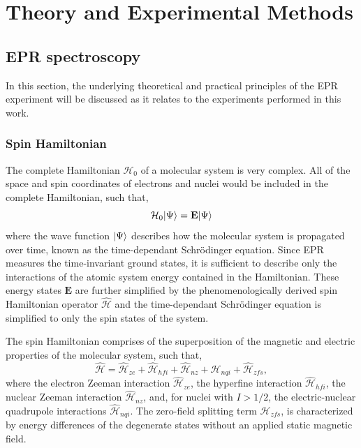 \chapter[Theory and Experimental Methods]{Theory and Experimental Methods}
\section{EPR spectroscopy}

In this section, the underlying theoretical and practical principles of the EPR experiment will be discussed as it relates to the experiments performed in this work. 

\subsection{Spin Hamiltonian}
The complete Hamiltonian $\mathcal{H}_0$ of a molecular system is very complex. All of the space and spin coordinates of electrons and nuclei would be included in the complete Hamiltonian, such that,
\begin{equation}
    \mathcal{H}_0 \lvert\Psi\rangle = {\mathbf E} \lvert\Psi\rangle
\end{equation}
where the wave function $\lvert\Psi\rangle$ describes how the molecular system is propagated over time, known as the time-dependant Schr\"{o}dinger equation. Since EPR measures the time-invariant ground states, it is sufficient to describe only the interactions of the atomic system energy contained in the Hamiltonian. These energy states ${\mathbf E}$ are further simplified by the phenomenologically derived spin Hamiltonian operator $\hat{\mathcal{H}}$ and the time-dependant Schr\"{o}dinger equation is simplified to only the spin states of the system. \cite{SpinDyn,abragam1961} 

The spin Hamiltonian comprises of the superposition of the magnetic and electric properties of the molecular system, such that,
\begin{equation}
    \hat{\mathcal{H}} = \hat{\mathcal{H}}_{ze} + \hat{\mathcal{H}}_{hfi} + \hat{\mathcal{H}}_{nz} + \hat{\mathcal{H}}_{nqi} + \hat{\mathcal{H}}_{zfs},
\end{equation}
where the electron Zeeman interaction $\hat{\mathcal{H}}_{ze}$, the hyperfine interaction $\hat{\mathcal{H}}_{hfi}$, the nuclear Zeeman interaction $\hat{\mathcal{H}}_{nz}$, and, for nuclei with $I > 1/2$, the electric-nuclear quadrupole interactions $\hat{\mathcal{H}}_{nqi}$. The zero-field splitting term $ \hat{\mathcal{H}}_{zfs}$, is characterized by energy differences of the degenerate states without an applied static magnetic field. 

